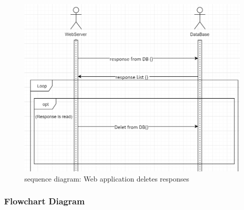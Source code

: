 \documentclass[12pt, oneside, a4paper]{book}
\begin{document}
				\begin{figure}[H]
					\includegraphics[width=\linewidth]{img/sequence_web_del_r.png}
					\caption{sequence diagram: Web application deletes responses}
					\label{web_delete_r}
				\end{figure}
				\newpage\subsubsection{Flowchart Diagram}
\end{document}
